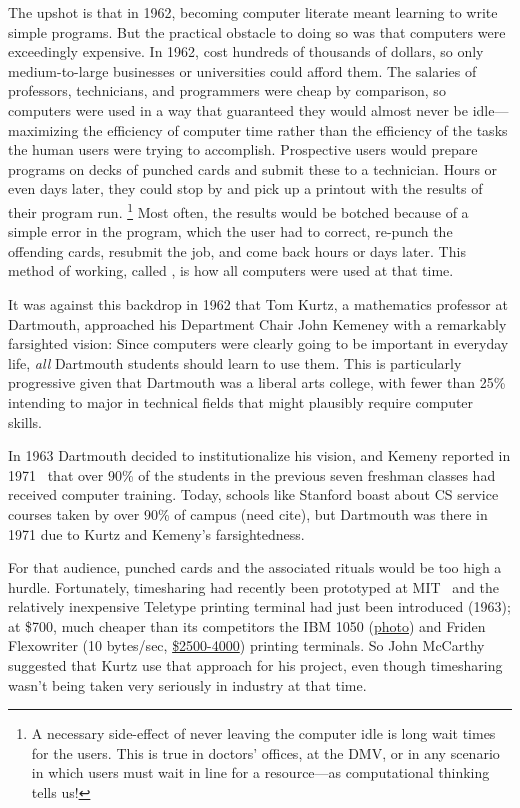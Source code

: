 \documentclass{article}
\begin{document}
The upshot is that in 1962, becoming computer literate meant learning to
write simple programs.  But the practical obstacle to doing so was that
computers were exceedingly expensive.  In 1962,  
cost hundreds of thousands of dollars, so only medium-to-large 
businesses or universities could afford them.  
The salaries of professors, technicians, and programmers were
cheap by comparison, so computers were used in a way that guaranteed
they would almost never be idle---maximizing the efficiency of computer
time rather than the efficiency of the tasks the human users were trying
to accomplish.
Prospective users would prepare programs on decks of punched
cards and submit these to a technician.  Hours or even days later, they
could stop by and pick up a printout with the results of their program run.
  \footnote{A necessary side-effect of never leaving the computer idle is long wait
  times for the users.  This is true in doctors' offices, at the DMV, or
  in any scenario in which users must wait in line for a resource---as
  computational thinking tells us!}
Most often, the results would be botched because of a simple error in
the program, which the user had to correct, re-punch the offending
cards, resubmit the job, and come back hours or days later.  This method
of working, called , is how all computers were used
at that time.

It was against this backdrop 
in 1962 that Tom Kurtz, a mathematics professor at Dartmouth, approached
his Department Chair John Kemeney with a remarkably farsighted vision:
Since computers were clearly going to be important in everyday
life, \emph{all} Dartmouth students should learn to use them.  This is
particularly progressive given that Dartmouth was a liberal arts college,
with fewer than 25\% intending to major in technical fields that might
plausibly require computer skills.~\cite{goto}

In 1963 Dartmouth decided to
institutionalize his vision, and Kemeny reported in
1971~\cite{man_and_computer} that
over 90\% of the students in the previous seven freshman classes had
received computer training.  Today, schools like Stanford boast about
CS service courses taken by over 90\% of campus (need cite), but
Dartmouth was there in 1971 due to Kurtz and Kemeny's farsightedness.

For that audience, punched cards and the associated rituals would be too
high a hurdle.
Fortunately, timesharing had recently been prototyped at
MIT~\cite{corbato62timesharing} and the relatively inexpensive Teletype
 printing terminal had just been introduced (1963); at \$700,
much cheaper than its competitors the IBM 1050
(\href{http://www.science.uva.nl/museum/ibm1050.php}{photo}) and
Friden Flexowriter (10 bytes/sec,
\href{http://retrotechnology.com/herbs_stuff/flex_behr.html}{\$2500-4000})
printing terminals.
So John McCarthy suggested that Kurtz use that approach for his project,
even though timesharing wasn't being taken very seriously in industry at
that time.
\end{document}
